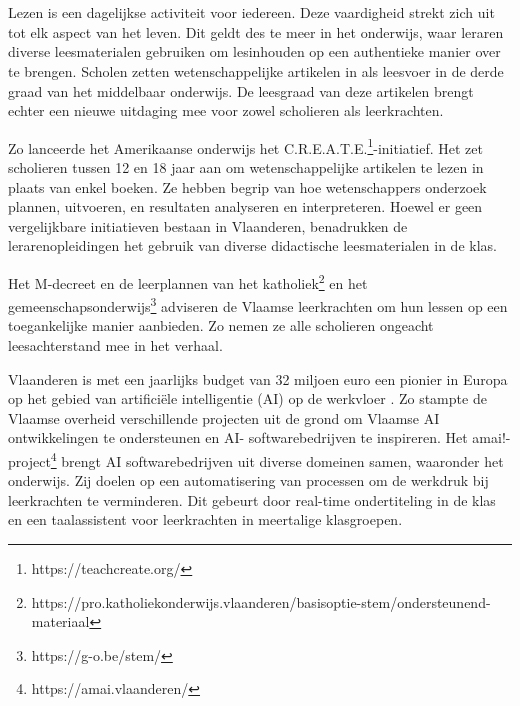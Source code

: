 
\chapter{}%
\label{ch:inleiding}

Lezen is een dagelijkse activiteit voor iedereen. Deze vaardigheid strekt zich  uit tot elk aspect van het leven. Dit geldt des te meer in het onderwijs, waar leraren diverse leesmaterialen gebruiken om lesinhouden op een authentieke manier over te brengen. Scholen zetten wetenschappelijke artikelen in als leesvoer in de derde graad van het middelbaar onderwijs. De leesgraad van deze artikelen brengt echter een nieuwe uitdaging mee voor zowel scholieren als leerkrachten. 

\medspace

Zo lanceerde het Amerikaanse onderwijs het C.R.E.A.T.E.\footnote{https://teachcreate.org/}-initiatief. Het zet scholieren tussen 12 en 18 jaar aan om wetenschappelijke artikelen te lezen in plaats van enkel boeken. Ze hebben begrip van hoe wetenschappers onderzoek plannen, uitvoeren, en resultaten analyseren en interpreteren. Hoewel er geen vergelijkbare initiatieven bestaan in Vlaanderen, benadrukken de lerarenopleidingen het gebruik van diverse didactische leesmaterialen in de klas.

\medspace

Het M-decreet en de leerplannen van het katholiek\footnote{https://pro.katholiekonderwijs.vlaanderen/basisoptie-stem/ondersteunend-materiaal} en het gemeenschapsonderwijs\footnote{https://g-o.be/stem/} adviseren de Vlaamse leerkrachten om hun lessen op een toegankelijke manier aanbieden. Zo nemen ze alle scholieren ongeacht leesachterstand mee in het verhaal.

\medspace

Vlaanderen is met een jaarlijks budget van 32 miljoen euro een pionier in Europa op het gebied van artificiële intelligentie (AI) op de werkvloer \autocite{Crevits2022}. Zo stampte de Vlaamse overheid verschillende  projecten uit de grond om Vlaamse AI ontwikkelingen te ondersteunen en AI- softwarebedrijven te inspireren. Het amai!-project\footnote{https://amai.vlaanderen/} brengt AI softwarebedrijven uit diverse domeinen samen, waaronder het onderwijs. Zij doelen op een automatisering van processen om de werkdruk bij leerkrachten te verminderen. Dit gebeurt door real-time ondertiteling in de klas en een taalassistent voor leerkrachten in meertalige klasgroepen.



